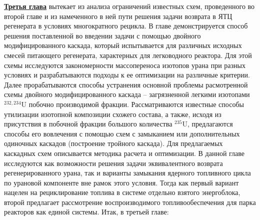 \underline{\textbf{Третья глава}} вытекает из анализа ограничений известных схем, проведенного во второй главе и из намеченного в ней пути решения задачи возврата в ЯТЦ регенерата в условиях многократного рецикла. В главе демонстрируется способ решения поставленной во введении задачи с помощью двойного модифицированного каскада, который испытывается для различных исходных смесей питающего регенерата, характерных для легководного реактора. Для этой схемы исследуются закономерности массопереноса изотопов урана при разных условиях и разрабатываются подходы к ее оптимизации на различные критерии. Далее прорабатываются способы устранения основной проблемы расмотренной схемы двойного модифицированного каскада -- загрязненной легкими изотопами $^{232,234}$U побочно производимой фракции. Рассматриваются известные способы утилизации изотопной композиции схожего состава, а также, исходя из присутствия в побочной фракции большого количества $^{235}$U, предлагаются способы его вовлечения с помощью схем с замыканием или дополнительных одиночных каскадов (построение тройного каскада). Для предлагаемых каскадных схем описывается методика расчета и оптимизации. В данной главе исследуются как возможности решения задачи эквивалентного возврата регенерированного урана, так и варианты замыкания ядерного топливного цикла по урановой компоненте вне рамок этого условия. Тогда как первый вариант нацелен на рециклирование топлива в системе отдельно взятого энергоблока, второй предлагает рассмотрение воспроизводимого топливообеспечения для парка реакторов как единой системы.
Итак, в третьей главе:
